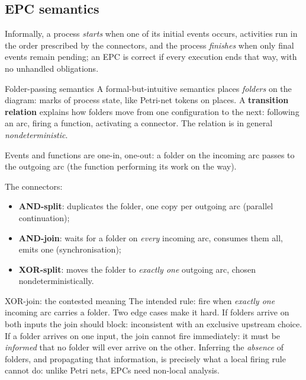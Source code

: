 \subsection{EPC semantics}

Informally, a process \emph{starts} when one of its initial events occurs, activities run in the order prescribed by the connectors, and the process \emph{finishes} when only final events remain pending; an EPC is correct if every execution ends that way, with no unhandled obligations.

\begin{definitionbox}{Folder-passing semantics}
A formal-but-intuitive semantics places \emph{folders} on the diagram: marks of process state, like Petri-net tokens on places. A \textbf{transition relation} explains how folders move from one configuration to the next: following an arc, firing a function, activating a connector. The relation is in general \emph{nondeterministic}.
\end{definitionbox}

Events and functions are one-in, one-out: a folder on the incoming arc passes to the outgoing arc (the function performing its work on the way).

The connectors:
\begin{itemize}
  \item \textbf{AND-split}: duplicates the folder, one copy per outgoing arc (parallel continuation);
  \item \textbf{AND-join}: waits for a folder on \emph{every} incoming arc, consumes them all, emits one (synchronisation);
  \item \textbf{XOR-split}: moves the folder to \emph{exactly one} outgoing arc, chosen nondeterministically.
\end{itemize}

\begin{notebox}{XOR-join: the contested meaning}
The intended rule: fire when \emph{exactly one} incoming arc carries a folder. Two edge cases make it hard. If folders arrive on both inputs the join should block: inconsistent with an exclusive upstream choice. If a folder arrives on one input, the join cannot fire immediately: it must be \emph{informed} that no folder will ever arrive on the other. Inferring the \emph{absence} of folders, and propagating that information, is precisely what a local firing rule cannot do: unlike Petri nets, EPCs need non-local analysis.
\end{notebox}

